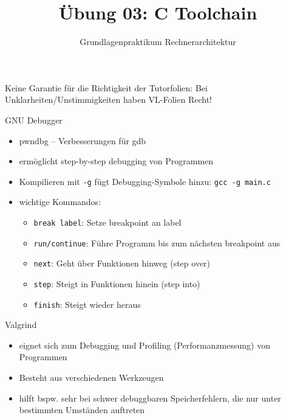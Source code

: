 

\title{Übung 03: C Toolchain}
\subtitle{Grundlagenpraktikum Rechnerarchitektur}
\date{}



\maketitle

\begin{frame}[c]{}{}
	\begin{center}
		\LARGE  Keine Garantie für die Richtigkeit der Tutorfolien: Bei Unklarheiten/Unstimmigkeiten
		haben VL-Folien Recht!
	\end{center}
\end{frame}



\begin{frame}[c, fragile]{GNU Debugger}{}
	\begin{itemize}
		\item pwndbg -- Verbesserungen für gdb
		\item ermöglicht step-by-step debugging von Programmen
		\item Kompilieren mit \verb|-g| fügt Debugging-Symbole hinzu: \verb|gcc -g main.c|
		\item wichtige Kommandos:
		      \begin{itemize}
			      \item \verb|break label|: Setze breakpoint an label
			      \item \verb|run/continue|: Führe Programm bis zum nächsten breakpoint aus
			      \item \verb|next|: Geht über Funktionen hinweg (step over)
			      \item \verb|step|: Steigt in Funktionen hinein (step into)
			      \item \verb|finish|: Steigt wieder heraus
		      \end{itemize}
	\end{itemize}
\end{frame}

\begin{frame}[c, fragile]{Valgrind}{}
	\begin{itemize}
		\item eignet sich zum Debugging und Profiling (Performanzmessung) von Programmen
		\item Besteht aus verschiedenen Werkzeugen
		\item hilft bspw. sehr bei schwer debuggbaren Speicherfehlern, die nur unter bestimmten
		      Umständen auftreten
	\end{itemize}
\end{frame}

